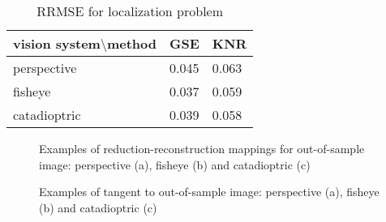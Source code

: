 \documentclass[conference]{IEEEtran} %
\begin{document}
\begin{table}[htbp]
\caption{RRMSE for localization problem}
\begin{center}
\begin{tabular}{|l|l|l|}
\hline
      vision system$\setminus$method       & GSE   & KNR   \\ \hline
perspective  & 0.045 & 0.063 \\ \hline
fisheye      & 0.037 & 0.059 \\ \hline
catadioptric & 0.039 & 0.058 \\ \hline
\end{tabular}
\label{table2}
\end{center}
\end{table}

\begin{figure}[h]

  \begin{minipage}{.33\linewidth}
  \centering
  \end{minipage}%
  \begin{minipage}{.33\linewidth}
  \centering
  \end{minipage}
  \begin{minipage}{.33\linewidth}
  \centering
  \end{minipage}

  \caption{Examples of reduction-reconstruction mappings for out-of-sample image: perspective (a), fisheye (b) and catadioptric (c)}
  \label{fig:2}
\end{figure}

\begin{figure}[h]

  \begin{minipage}{.33\linewidth}
  \centering
  \end{minipage}%
  \begin{minipage}{.33\linewidth}
  \centering
  \end{minipage}
  \begin{minipage}{.33\linewidth}
  \centering
  \end{minipage}

  \caption{Examples of tangent to out-of-sample image: perspective (a), fisheye (b) and catadioptric (c)}
  \label{fig:3}
\end{figure}
\end{document}
